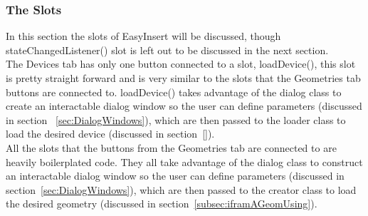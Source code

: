 %
%
%


\subsubsection{The Slots}
\label{eiSlots}
In this section the slots of EasyInsert will be discussed, though stateChangedListener() slot is left out to be discussed in the next section.\\

The Devices tab has only one button connected to a slot, loadDevice(), this slot is pretty straight forward and is very similar to the slots that the Geometries tab buttons are connected to. loadDevice() takes advantage of the dialog class to create an interactable dialog window so the user can define parameters (discussed in section ~\ref{sec:DialogWindows}), which are then passed to the loader class to load the desired device (discussed in section~\ref{}).\\

All the slots that the buttons from the Geometries tab are connected to are heavily boilerplated code. They all take advantage of the dialog class to construct an interactable dialog window so the user can define parameters (discussed in section~\ref{sec:DialogWindows}), which are then passed to the creator class to load the desired geometry (discussed in section~\ref{subsec:iframAGeomUsing}).\\

